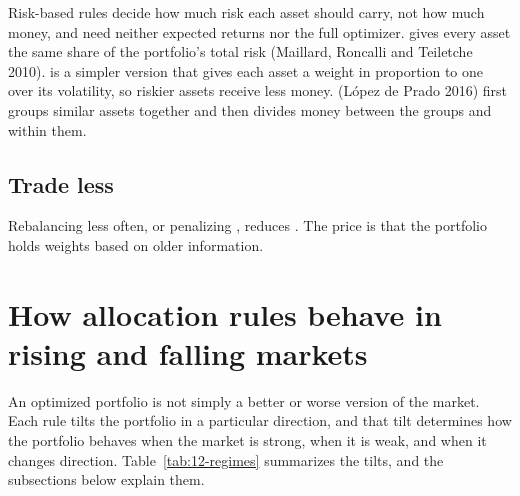 Risk-based rules decide how much risk each asset should carry, not how much money, and need neither expected returns nor the full optimizer.  gives every asset the same share of the portfolio's total risk (Maillard, Roncalli and Teiletche 2010).  is a simpler version that gives each asset a weight in proportion to one over its volatility, so riskier assets receive less money.  (L\'opez de Prado 2016) first groups similar assets together and then divides money between the groups and within them.

\subsection{Trade less}

Rebalancing less often, or penalizing \label{kt:turnover}, reduces . The price is that the portfolio holds weights based on older information.


\section{How allocation rules behave in rising and falling markets}
\label{sec:12-regimes}

An optimized portfolio is not simply a better or worse version of the market. Each rule tilts the portfolio in a particular direction, and that tilt determines how the portfolio behaves when the market is strong, when it is weak, and when it changes direction. Table~\ref{tab:12-regimes} summarizes the tilts, and the subsections below explain them.

